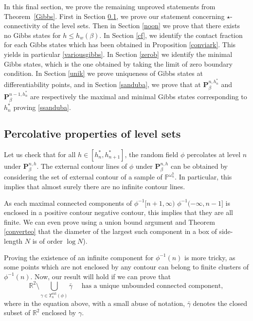 \documentclass[10pt]{amsart}
\numberwithin{equation}{section}
\theoremstyle{plain}
\theoremstyle{definition}
\newcommand{\ext}{\mathrm{ext}}
\newcommand{\bP}{{\ensuremath{\mathbf P}} }
\newcommand{\bbP}{{\ensuremath{\mathbb P}} }
\newcommand{\bbR}{{\ensuremath{\mathbb R}} }
\newcommand{\gb}{\beta}
\newcommand{\go}{\omega}
\begin{document}
In this final section, we prove the remaining unproved statements from Theorem~\ref{Gibbs}.
First in Section \ref{start}, we prove our statement concerning $\star$-connectivity of the level sets.
Then in Section \ref{noon} we prove that there exists no Gibbs states for $h\le h_w(\gb)$.
In Section \ref{cf}, we identify the contact fraction for each Gibbs states which has been obtained in Proposition \ref{conviark}.
This yields in particular \eqref{variousgibbs}.
In Section \ref{zerob} we identify the minimal Gibbs states, which is the one obtained by taking the limit of zero boundary condition.
In Section \ref{unik} we prove uniqueness of Gibbs states at differentiability points, and in Section \ref{sanduba}, we prove that at
$\bP^{n,h^*_n}_{\gb}$ and $\bP^{n-1,h^*_n}_{\gb}$ are respectively the maximal and minimal Gibbs states corresponding to $h^*_n$ proving \eqref{ssanduba}.

\subsection{Percolative properties of level sets}\label{start}

Let us check that for all $h\in [h^*_n,h^*_{n+1}]$, the random field $\phi$ percolates at level $n$ under $\bP^{n,h}_{\gb}$.
The external contour lines of $\phi$ under $\bP^{n,h}_{\gb}$ can be obtained by considering the set of external contour of a sample of
$\bbP^{\go^h_n}$. In particular, this implies that almost surely there are no infinite contour lines.

As each maximal connected components of $\phi^{-1}[n+1,\infty)$ \resp $\phi^{-1}(-\infty,n-1]$ is enclosed in a positive contour \resp negative contour,
this implies that they are all finite. We can even prove using a union bound argument and Theorem \ref{converteo} that the diameter of the
largest such component in a box of side-length $N$ is of order $\log N$).

Proving the existence of an infinite component for $\phi^{-1}(n)$ is more tricky, as some points which are not enclosed by any contour can belong to finite clusters of
$\phi^{-1}(n)$. Now, our result will hold if we can prove that
\begin{equation}\label{thatsallfolks}
\bbR^2\setminus \bigcup_{\gamma\in \Upsilon^{\ext}_n(\phi)} \bar \gamma \quad \text{ has a unique unbounded connected component},
\end{equation}
where in the equation above, with a small abuse of notation, $\bar \gamma$ denotes the closed subset of $\bbR^2$ enclosed by $\gamma$.
\end{document}
